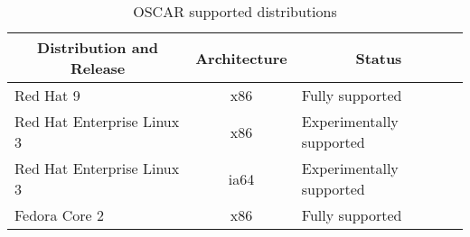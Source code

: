%
%
%

\begin{table}[htbp]
  \begin{center}
    \begin{tabular}{|l|c|p{3in}|}
      \hline
      \multicolumn{1}{|c|}{Distribution and Release} &
      \multicolumn{1}{|c|}{Architecture} &
      \multicolumn{1}{|c|}{Status} \\
      \hline
      \hline
      Red Hat 9 & x86 &Fully supported \\
%
      Red Hat Enterprise Linux 3 & x86 & Experimentally supported \\
%
      Red Hat Enterprise Linux 3 & ia64 & Experimentally supported \\
%
\hline
%
      Fedora Core 2 & x86 & Fully supported \\
%
\hline
%
    \end{tabular}
    \caption{OSCAR supported distributions}
    \label{tab:oscar-distro-support}
  \end{center}
\end{table}
